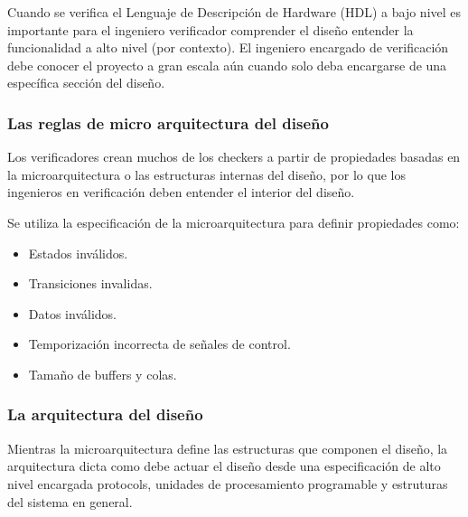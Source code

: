Cuando se verifica el Lenguaje de Descripción de Hardware (HDL) a bajo nivel es importante para el ingeniero verificador comprender el diseño entender la funcionalidad a alto nivel (por contexto). El ingeniero encargado de verificación debe conocer el proyecto a gran escala aún cuando solo deba encargarse de una específica sección del diseño.

\subsubsection{Las reglas de micro arquitectura del diseño} 

Los verificadores crean muchos de los checkers a partir de propiedades basadas en la microarquitectura o las estructuras internas del diseño, por lo que los ingenieros en verificación deben entender el interior del diseño.  

Se utiliza la especificación de la microarquitectura para definir propiedades como:
\begin{itemize}
\item Estados inválidos.
\item Transiciones invalidas.
\item Datos inválidos.
\item Temporización incorrecta de señales de control.
\item Tamaño de buffers y colas.
\end{itemize}

\subsubsection{La arquitectura del diseño} 
Mientras la microarquitectura define las estructuras que componen el diseño, la arquitectura dicta como debe actuar el diseño desde una especificación de alto nivel encargada protocols, unidades de procesamiento programable y estruturas del sistema en general.